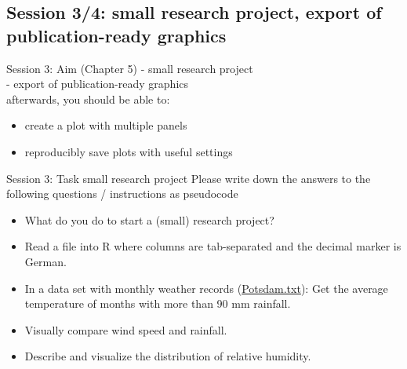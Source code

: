 \documentclass[xcolor=table,       handout,    xcolor=dvipsnames]{beamer}\usepackage[]{graphicx}\usepackage[]{color}
\newcommand{\datalink}[1]{\href{https://raw.githubusercontent.com/brry/course/master/data/#1}{#1}}
\begin{document}
\subsection{Session 3/4: small research project, export of publication-ready graphics}

\begin{frame}{Session 3: Aim (Chapter 5)}
\pause - small research project\\
\pause - export of publication-ready graphics\\
\pause afterwards, you should be able to:
\pause
\begin{itemize}[<+->]
\item create a plot with multiple panels
\item reproducibly save plots with useful settings
\end{itemize}
\end{frame}


\begin{frame}{Session 3: Task small research project}
Please write down the answers to the following questions / instructions as pseudocode
\begin{itemize}
\item What do you do to start a (small) research project?
\item Read a file into R where columns are tab-separated and the decimal marker is German.
\item In a data set with monthly weather records (\datalink{Potsdam.txt}): Get the average temperature of months with more than 90 mm rainfall.
\item Visually compare wind speed and rainfall.
\item Describe and visualize the distribution of relative humidity.
\end{itemize}
\end{frame}



\end{document}
